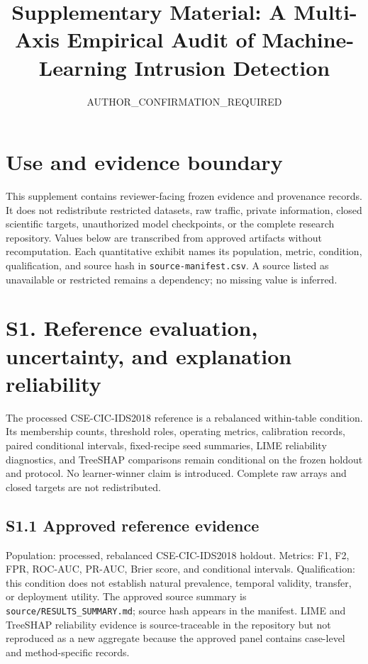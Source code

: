 \documentclass[preprint,12pt]{elsarticle}
\title{Supplementary Material: A Multi-Axis Empirical Audit of Machine-Learning Intrusion Detection}
\author[anon]{AUTHOR\_CONFIRMATION\_REQUIRED}
\begin{document}
\maketitle
\section*{Use and evidence boundary}
This supplement contains reviewer-facing frozen evidence and provenance records. It does not redistribute restricted datasets, raw traffic, private information, closed scientific targets, unauthorized model checkpoints, or the complete research repository. Values below are transcribed from approved artifacts without recomputation. Each quantitative exhibit names its population, metric, condition, qualification, and source hash in \texttt{source-manifest.csv}. A source listed as unavailable or restricted remains a dependency; no missing value is inferred.

\section*{S1. Reference evaluation, uncertainty, and explanation reliability}
The processed CSE-CIC-IDS2018 reference is a rebalanced within-table condition. Its membership counts, threshold roles, operating metrics, calibration records, paired conditional intervals, fixed-recipe seed summaries, LIME reliability diagnostics, and TreeSHAP comparisons remain conditional on the frozen holdout and protocol. No learner-winner claim is introduced. Complete raw arrays and closed targets are not redistributed.

\subsection*{S1.1 Approved reference evidence}
Population: processed, rebalanced CSE-CIC-IDS2018 holdout. Metrics: F1, F2, FPR, ROC-AUC, PR-AUC, Brier score, and conditional intervals. Qualification: this condition does not establish natural prevalence, temporal validity, transfer, or deployment utility. The approved source summary is \texttt{source/RESULTS\_SUMMARY.md}; source hash appears in the manifest. LIME and TreeSHAP reliability evidence is source-traceable in the repository but not reproduced as a new aggregate because the approved panel contains case-level and method-specific records.
\end{document}
